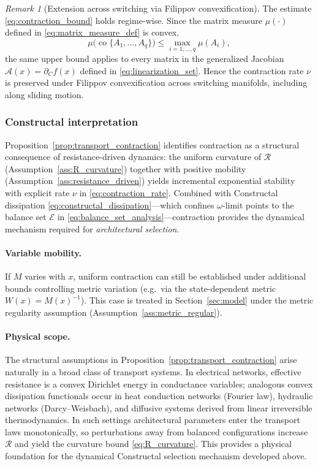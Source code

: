 \documentclass[12pt]{article}
\theoremstyle{plain}
\theoremstyle{definition}
\theoremstyle{remark}
\newtheorem{remark}[theorem]{Remark}
\begin{document}
\begin{remark}[Extension across switching via Filippov convexification]
\label{rem:filippov_contraction_extension}
The estimate \eqref{eq:contraction_bound} holds regime-wise. Since the
matrix measure $\mu(\cdot)$ defined in \eqref{eq:matrix_measure_def} is
convex,
\[
\mu\!\big(\operatorname{co}\{A_1,\dots,A_q\}\big)
\le \max_{i=1,\dots,q}\mu(A_i),
\]
the same upper bound applies to every matrix in the generalized
Jacobian $\mathcal A(x)=\partial_C f(x)$ defined in
\eqref{eq:linearization_set}. Hence the contraction rate $\nu$ is
preserved under Filippov convexification across switching manifolds,
including along sliding motion.
\end{remark}

\subsubsection*{Constructal interpretation}

Proposition~\ref{prop:transport_contraction} identifies contraction as a
structural consequence of resistance-driven dynamics: the uniform
curvature of $\mathcal R$ (Assumption~\ref{ass:R_curvature}) together
with positive mobility (Assumption~\ref{ass:resistance_driven}) yields
incremental exponential stability with explicit rate
$\nu$ in \eqref{eq:contraction_rate}. Combined with Constructal
dissipation \eqref{eq:constructal_dissipation}—which confines
$\omega$-limit points to the balance set
$\mathcal E$ in \eqref{eq:balance_set_analysis}—contraction provides the
dynamical mechanism required for \emph{architectural selection}.

\paragraph{Variable mobility.}
If $M$ varies with $x$, uniform contraction can still be established
under additional bounds controlling metric variation
(e.g.\ via the state-dependent metric $W(x)=M(x)^{-1}$).
This case is treated in Section~\ref{sec:model}
under the metric regularity assumption
(Assumption~\ref{ass:metric_regular}).

\paragraph{Physical scope.}
The structural assumptions in Proposition~\ref{prop:transport_contraction}
arise naturally in a broad class of transport systems. In electrical
networks, effective resistance is a convex Dirichlet energy in
conductance variables; analogous convex dissipation functionals occur in
heat conduction networks (Fourier law), hydraulic networks
(Darcy--Weisbach), and diffusive systems derived from linear irreversible
thermodynamics. In such settings architectural parameters enter the
transport laws monotonically, so perturbations away from balanced
configurations increase $\mathcal R$ and yield the curvature bound
\eqref{eq:R_curvature}. This provides a physical foundation for the
dynamical Constructal selection mechanism developed above.
\end{document}
